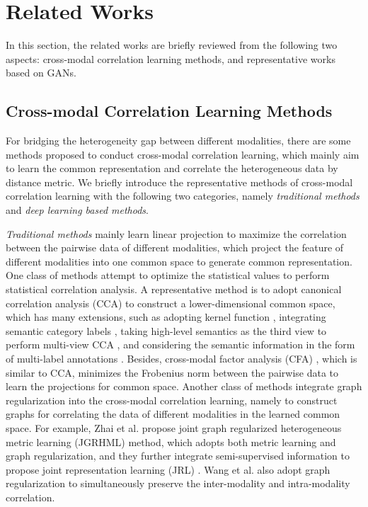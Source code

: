 \documentclass[journal]{IEEEtran}
\begin{document}
\section{Related Works}

In this section, the related works are briefly reviewed from the following two aspects: cross-modal correlation learning methods, and representative works based on GANs.

\subsection{Cross-modal Correlation Learning Methods}

For bridging the heterogeneity gap between different modalities, there are some methods proposed to conduct cross-modal correlation learning, which mainly aim to learn the common representation and correlate the heterogeneous data by distance metric. We briefly introduce the representative methods of cross-modal correlation learning with the following two categories, namely \textit{traditional methods} and \textit{deep learning based methods}.

\textit{Traditional methods} mainly learn linear projection to maximize the correlation between the pairwise data of different modalities, which project the feature of different modalities into one common space to generate common representation. One class of methods attempt to optimize the statistical values to perform statistical correlation analysis. A representative method is to adopt canonical correlation analysis (CCA) \cite{HotelingBiometrika36RelationBetweenTwoVariates} to construct a lower-dimensional common space, which has many extensions, such as adopting kernel function \cite{DBLP:journals/neco/HardoonSS04}, integrating semantic category labels \cite{RasiwasiaMM10SemanticCCA}, taking high-level semantics as the third view to perform multi-view CCA \cite{DBLP:journals/ijcv/GongKIL14}, and considering the semantic information in the form of multi-label annotations \cite{DBLP:conf/iccv/RanjanRJ15}. Besides, cross-modal factor analysis (CFA) \cite{LiMM03CFA}, which is similar to CCA, minimizes the Frobenius norm between the pairwise data to learn the projections for common space. Another class of methods integrate graph regularization into the cross-modal correlation learning, namely to construct graphs for correlating the data of different modalities in the learned common space. For example, Zhai et al. \cite{ZhaiAAAI2013JGRHML} propose joint graph regularized heterogeneous metric learning (JGRHML) method, which adopts both metric learning and graph regularization, and they further integrate semi-supervised information to propose joint representation learning (JRL) \cite{ZhaiTCSVT2014JRL}. Wang et al. \cite{DBLP:journals/pami/WangHWWT16} also adopt graph regularization to simultaneously preserve the inter-modality and intra-modality correlation.
\end{document}
